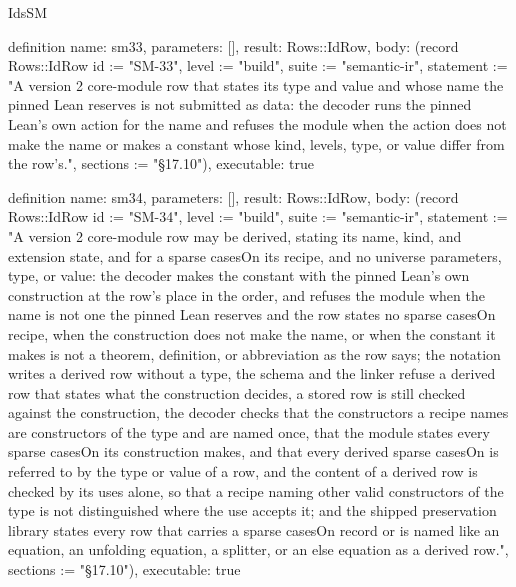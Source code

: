 \begin{lexlean}{IdsSM}
\begin{semanticmodule}
definition{
  name: sm33,
  parameters: [],
  result: Rows::IdRow,
  body: (record Rows::IdRow {id := "SM-33", level := "build", suite := "semantic-ir", statement := "A version 2 core-module row that states its type and value and whose name the pinned Lean reserves is not submitted as data: the decoder runs the pinned Lean's own action for the name and refuses the module when the action does not make the name or makes a constant whose kind, levels, type, or value differ from the row's.", sections := "§17.10"}),
  executable: true
}

definition{
  name: sm34,
  parameters: [],
  result: Rows::IdRow,
  body: (record Rows::IdRow {id := "SM-34", level := "build", suite := "semantic-ir", statement := "A version 2 core-module row may be derived, stating its name, kind, and extension state, and for a sparse casesOn its recipe, and no universe parameters, type, or value: the decoder makes the constant with the pinned Lean's own construction at the row's place in the order, and refuses the module when the name is not one the pinned Lean reserves and the row states no sparse casesOn recipe, when the construction does not make the name, or when the constant it makes is not a theorem, definition, or abbreviation as the row says; the notation writes a derived row without a type, the schema and the linker refuse a derived row that states what the construction decides, a stored row is still checked against the construction, the decoder checks that the constructors a recipe names are constructors of the type and are named once, that the module states every sparse casesOn its construction makes, and that every derived sparse casesOn is referred to by the type or value of a row, and the content of a derived row is checked by its uses alone, so that a recipe naming other valid constructors of the type is not distinguished where the use accepts it; and the shipped preservation library states every row that carries a sparse casesOn record or is named like an equation, an unfolding equation, a splitter, or an else equation as a derived row.", sections := "§17.10"}),
  executable: true
}


\end{semanticmodule}
\end{lexlean}
